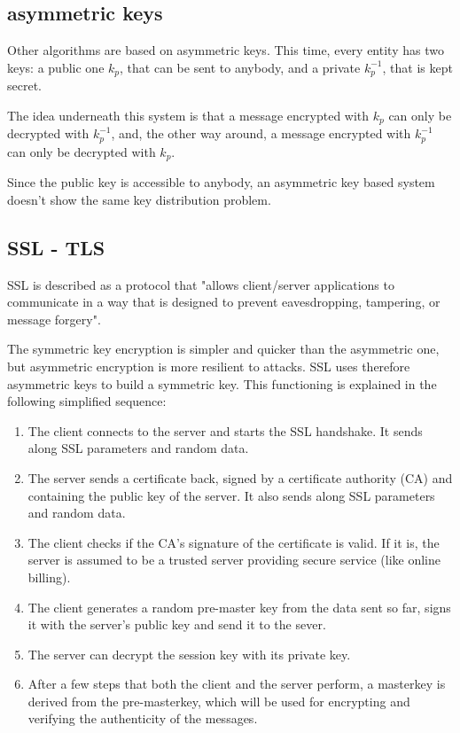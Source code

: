 \subsection{asymmetric keys}
Other algorithms are based on asymmetric keys. This time, every entity has two keys: a public one $k_{p}$, that can be sent to anybody, and a private $ k_{p}^{-1} $, that is kept secret.

The idea underneath this system is that a message encrypted with $k_{p}$ can only be decrypted with $ k_{p}^{-1} $, and, the other way around, a message encrypted with $ k_{p}^{-1} $ can only be decrypted with $k_{p}$.

Since the public key is accessible to anybody, an asymmetric key based system doesn't show the same key distribution problem.

\subsection{SSL - TLS}
SSL is described\cite{freier2011secure} as a protocol that "allows client/server applications to communicate in a way that is designed to prevent eavesdropping, tampering, or message forgery".

The symmetric key encryption is simpler and quicker than the asymmetric one, but asymmetric encryption is more resilient to attacks. SSL uses therefore asymmetric keys to build a symmetric key. This functioning is explained in the following simplified sequence:

\begin{enumerate}
	\item The client connects to the server and starts the SSL handshake. It sends along SSL parameters and random data.
	\item The server sends a certificate back, signed by a certificate authority (CA) and containing the public key of the server. It also sends along SSL parameters and random data.
	\item The client checks if the CA's signature of the certificate is valid. If it is, the server is assumed to be a trusted server providing secure service (like online billing).
	\item The client generates a random pre-master key from the data sent so far, signs it with the server's public key and send it to the sever.
	\item The server can decrypt the session key with its private key. 
	\item After a few steps that both the client and the server perform, a masterkey is derived from the pre-masterkey, which will be used for encrypting and verifying the authenticity of the messages.
\end{enumerate}

